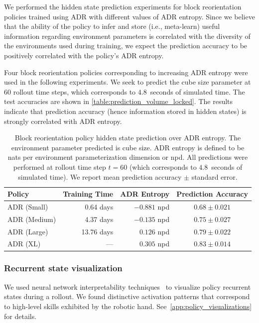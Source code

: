 We performed the hidden state prediction experiments for block reorientation policies trained using ADR with different values of ADR entropy. Since we believe that the ability of the policy to infer and store (i.e., meta-learn) useful information regarding environment parameters is correlated with the diversity of the environments used during training, we expect the prediction accuracy to be positively correlated with the policy's ADR entropy. 

Four block reorientation policies corresponding to increasing ADR entropy were used in the following experiments. We seek to predict the cube size parameter at $60$ rollout time steps, which corresponds to $4.8$~seconds of simulated time. The test accuracies are shown in \autoref{table:prediction_volume_locked}. The results indicate that prediction accuracy (hence information stored in hidden states) is strongly correlated with ADR entropy. 

\begin{table}[h]
    \caption{Block reorientation policy hidden state prediction over ADR entropy. The environment parameter predicted is cube size. ADR entropy is defined to be nats per environment parameterization dimension or npd. All predictions were performed at rollout time step $t=60$ (which corresponds to $4.8$~seconds of simulated time). We report mean prediction accuracy $\pm$ standard error.}
    \centering
    \renewcommand{\arraystretch}{1.3}
    \begin{tabular}{@{}lrrc@{}}
        \toprule
        \textbf{Policy} & \textbf{Training Time} & \textbf{ADR Entropy} & \textbf{Prediction Accuracy} \\
	\midrule
	ADR (Small) & 0.64 days & $-0.881$ npd & $0.68 \pm 0.021$ \\
	ADR (Medium) & 4.37 days & $-0.135$ npd & $0.75 \pm 0.027$ \\
	ADR (Large) & 13.76 days & $0.126$ npd & $0.79 \pm 0.022$ \\
	ADR (XL) & --- & $0.305$ npd & $\mathbf{0.83 \pm 0.014}$ \\
        \bottomrule
    \end{tabular}
    \label{table:prediction_volume_locked}
\end{table}

\subsubsection{Recurrent state visualization}
We used neural network interpretability techniques~\cite{carter2016experiments, olah2018the} to visualize policy recurrent states during a rollout. We found distinctive activation patterns that correspond to high-level skills exhibited by the robotic hand. See~\autoref{app:policy_visualizations} for details.